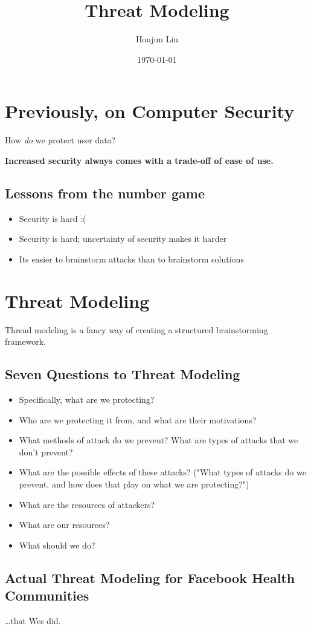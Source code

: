 \documentclass[letterpaper]{article}
\author{Houjun Liu}
\date{\today}
\title{Threat Modeling}
\renewcommand{\tableofcontents}{}
\begin{document}
\tableofcontents


\section{Previously, on Computer Security}
\label{sec:org5b44a29}
How \emph{do} we protect user data?

\textbf{\textbf{Increased security always comes with a trade-off of ease of use.}}

\subsection{Lessons from the number game}
\label{sec:orgacb15d5}
\begin{itemize}
\item Security is hard :(
\item Security is hard; uncertainty of security makes it harder
\item Its easier to brainstorm attacks than to brainstorm solutions
\end{itemize}

\section{Threat Modeling}
\label{sec:org94e9113}
Thread modeling is a fancy way of creating a structured brainstorming framework.

\subsection{Seven Questions to Threat Modeling}
\label{sec:org23b71a6}
\begin{itemize}
\item Specifically, what are we protecting?
\item Who are we protecting it from, and what are their motivations?
\item What methods of attack do we prevent? What are types of attacks that we don't prevent?
\item What are the possible effects of these attacks? ("What types of attacks do we prevent, and how does that play on what we are protecting?")
\item What are the resources of attackers?
\item What are our resources?
\item What should we do?
\end{itemize}

\subsection{Actual Threat Modeling for Facebook Health Communities}
\label{sec:orgaf37d20}
\ldots{}that Wes did.
\end{document}
